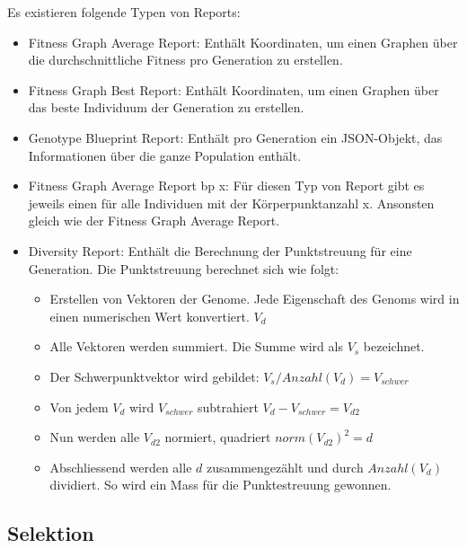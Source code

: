       \medskip

      Es existieren folgende Typen von Reports:

      \begin{itemize}

        \item Fitness Graph Average Report: Enthält Koordinaten,
          um einen Graphen über die durchschnittliche Fitness pro Generation zu erstellen.

        \item Fitness Graph Best Report: Enthält Koordinaten,
          um einen Graphen über das beste Individuum der Generation zu erstellen.

        \item Genotype Blueprint Report: Enthält pro Generation ein \gls{JSON}-Objekt,
          das Informationen über die ganze Population enthält.

        \item Fitness Graph Average Report bp x: Für diesen Typ von Report gibt es jeweils einen für alle Individuen mit der Körperpunktanzahl x.
              Ansonsten gleich wie der Fitness Graph Average Report.

        \item Diversity Report: Enthält die Berechnung der Punktstreuung für eine Generation.
          Die Punktstreuung berechnet sich wie folgt:

        \begin{itemize}
          \item Erstellen von Vektoren der Genome. Jede Eigenschaft des Genoms wird in einen numerischen Wert konvertiert. \( V_d \)
          \item Alle Vektoren werden summiert. Die Summe wird als \(V_s\) bezeichnet.
          \item Der Schwerpunktvektor wird gebildet: \( V_s / Anzahl(V_d) = V_{schwer} \)
          \item Von jedem \(V_d\) wird \(V_{schwer}\) subtrahiert  \( V_d - V_{schwer}  = V_{d2} \)
          \item Nun werden alle \(V_{d2}\) normiert, quadriert \( norm{(V_{d2})}^2 = d \)
          \item Abschliessend werden alle \(d\) zusammengezählt und durch \(Anzahl(V_d)\) dividiert. So wird ein Mass für die Punktestreuung gewonnen.
        \end{itemize}
      \end{itemize}

    \subsection{Selektion\label{sec:Selektion}}

